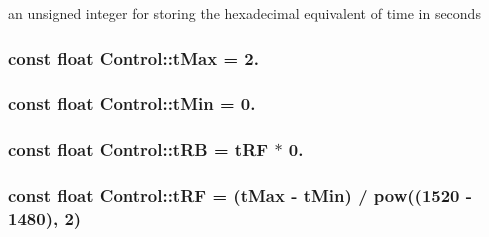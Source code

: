 an unsigned integer for storing the hexadecimal equivalent of time in seconds 

\subsubsection[{\texorpdfstring{t\+Max}{tMax}}]{\setlength{\rightskip}{0pt plus 5cm}const float Control\+::t\+Max = 2.\hspace{0.3cm}{\ttfamily [private]}}\hypertarget{classControl_aa0dfe0af55adef6ba02ba98cd538de6f}{}\label{classControl_aa0dfe0af55adef6ba02ba98cd538de6f}
\subsubsection[{\texorpdfstring{t\+Min}{tMin}}]{\setlength{\rightskip}{0pt plus 5cm}const float Control\+::t\+Min = 0.\hspace{0.3cm}{\ttfamily [private]}}\hypertarget{classControl_a7cccef9b9893cbc515c85be334d34108}{}\label{classControl_a7cccef9b9893cbc515c85be334d34108}
\subsubsection[{\texorpdfstring{t\+RB}{tRB}}]{\setlength{\rightskip}{0pt plus 5cm}const float Control\+::t\+RB = {\bf t\+RF} $\ast$ 0.\hspace{0.3cm}{\ttfamily [private]}}\hypertarget{classControl_a5a5a86dff393624defa3747d2e2a39b3}{}\label{classControl_a5a5a86dff393624defa3747d2e2a39b3}
\subsubsection[{\texorpdfstring{t\+RF}{tRF}}]{\setlength{\rightskip}{0pt plus 5cm}const float Control\+::t\+RF = ({\bf t\+Max} -\/ {\bf t\+Min}) / pow((1520 -\/ 1480), 2)\hspace{0.3cm}{\ttfamily [private]}}\hypertarget{classControl_acc43d71e4a89ff753f7d12f7fa562f7f}{}\label{classControl_acc43d71e4a89ff753f7d12f7fa562f7f}
